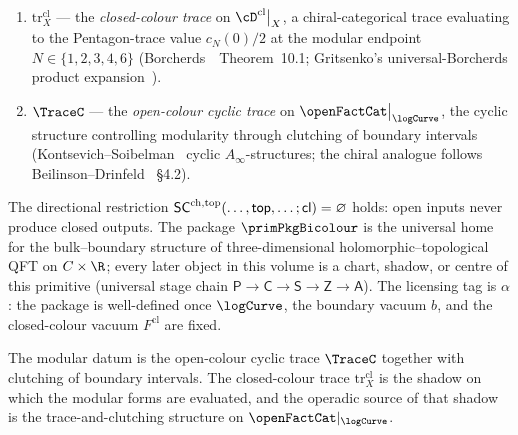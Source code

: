 \begin{definition}
\begin{enumerate}[label=\textup{(\roman*)},itemsep=2pt]
 $\FM_k(\C) \times \Conf_m(\R)$ (Voronov~\cite{Voronov1998}
 Swiss-cheese operad; the chiral upgrade is the bulk-to-boundary
 OPE residue of Beilinson--Drinfeld~\cite{BD04} \S3.4.6).
\item $\mathrm{tr}^{\mathrm{cl}}_X$ --- the \emph{closed-colour
 trace} on $\cD^{\mathrm{cl}}\big|_X$, a chiral-categorical
 trace evaluating to the Pentagon-trace value $c_N(0)/2$ at
 the modular endpoint $N \in \{1, 2, 3, 4, 6\}$
 (Borcherds~\cite{Borcherds95}~Theorem~10.1; Gritsenko's
 universal-Borcherds product expansion~\cite{Gritsenko1999}).
\item $\TraceC$ --- the \emph{open-colour cyclic trace} on
 $\openFactCat\big|_{\logCurve}$, the cyclic structure
 controlling modularity through clutching of boundary
 intervals (Kontsevich--Soibelman~\cite{KS09} cyclic
 $A_\infty$-structures; the chiral analogue follows
 Beilinson--Drinfeld~\cite{BD04} \S4.2).
\end{enumerate}
The directional restriction
$\mathsf{SC}^{\mathrm{ch},\mathrm{top}}(\ldots, \mathsf{top}, \ldots; \mathsf{cl}) = \varnothing$
holds: open inputs never produce closed outputs. The package
$\primPkgBicolour$ is the universal home for the bulk--boundary
structure of three-dimensional holomorphic--topological QFT on
$C \times \R$; every later object in this volume is a chart,
shadow, or centre of this primitive (universal stage chain
$\mathsf{P} \to \mathsf{C} \to \mathsf{S} \to \mathsf{Z} \to \mathsf{A}$).
The licensing tag is $\alpha$: the package is well-defined once
$\logCurve$, the boundary vacuum $b$, and the closed-colour
vacuum $F^{\mathrm{cl}}$ are fixed.
\end{definition}

\begin{remark}
\label{rem:bicoloured-primitive-modularity}
The modular datum is the open-colour cyclic trace $\TraceC$
together with clutching of boundary intervals. The closed-colour
trace $\mathrm{tr}^{\mathrm{cl}}_X$ is the shadow on which the
modular forms are evaluated, and the operadic source of that shadow
is the trace-and-clutching structure on $\openFactCat|_{\logCurve}$.
\end{remark}


